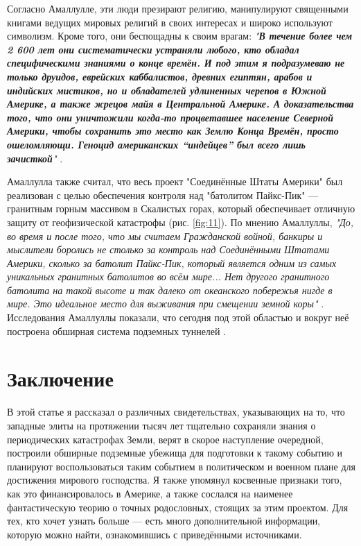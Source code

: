 \documentclass[10pt,twocolumn,letterpaper]{article}
\begin{document}
Согласно Амаллулле, эти люди презирают религию, манипулируют священными книгами ведущих мировых религий в своих интересах и широко используют символизм. Кроме того, они беспощадны к своим врагам: \textit{"\textbf{В течение более чем 2 600 лет они систематически устраняли любого, кто обладал специфическими знаниями о конце времён. И под этим я подразумеваю не только друидов, еврейских каббалистов, древних египтян, арабов и индийских мистиков, но и обладателей удлиненных черепов в Южной Америке, а также жрецов майя в Центральной Америке. А доказательства того, что они уничтожили когда-то процветавшее население Северной Америки, чтобы сохранить это место как Землю Конца Времён, просто ошеломляющи. Геноцид американских “индейцев” был всего лишь зачисткой}"} \cite{33,34}.

Амаллулла также считал, что весь проект "Соединённые Штаты Америки" был реализован с целью обеспечения контроля над "батолитом Пайкс-Пик" — гранитным горным массивом в Скалистых горах, который обеспечивает отличную защиту от геофизической катастрофы (рис. \ref{fig:11}). По мнению Амаллуллы, \textit{"До, во время и после того, что мы считаем Гражданской войной, банкиры и мыслители боролись не столько за контроль над Соединёнными Штатами Америки, сколько за батолит Пайкс-Пик, который является одним из самых уникальных гранитных батолитов во всём мире... Нет другого гранитного батолита на такой высоте и так далеко от океанского побережья нигде в мире. Это идеальное место для выживания при смещении земной коры"} \cite{33,34}. Исследования Амаллуллы показали, что сегодня под этой областью и вокруг неё построена обширная система подземных туннелей \cite{36}.

\section{Заключение}

В этой статье я рассказал о различных свидетельствах, указывающих на то, что западные элиты на протяжении тысяч лет тщательно сохраняли знания о периодических катастрофах Земли, верят в скорое наступление очередной, построили обширные подземные убежища для подготовки к такому событию и планируют воспользоваться таким событием в политическом и военном плане для достижения мирового господства. Я также упомянул косвенные признаки того, как это финансировалось в Америке, а также сослался на наименее фантастическую теорию о точных родословных, стоящих за этим проектом. Для тех, кто хочет узнать больше — есть много дополнительной информации, которую можно найти, ознакомившись с приведёнными источниками.
\end{document}
